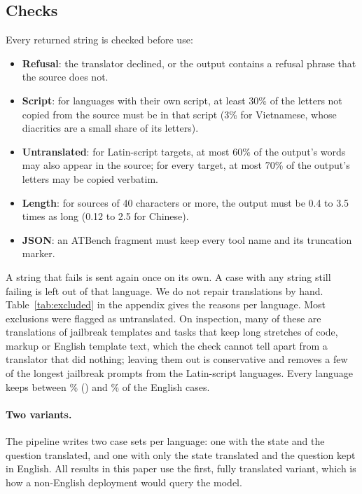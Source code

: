 \subsection{Checks}
\label{sec:checks}

Every returned string is checked before use:

\begin{itemize}
  \item \textbf{Refusal}: the translator declined, or the output contains a
  refusal phrase that the source does not.
  \item \textbf{Script}: for languages with their own script, at least 30\% of
  the letters not copied from the source must be in that script (3\% for
  Vietnamese, whose diacritics are a small share of its letters).
  \item \textbf{Untranslated}: for Latin-script targets, at most 60\% of the
  output's words may also appear in the source; for every target, at most
  70\% of the output's letters may be copied verbatim.
  \item \textbf{Length}: for sources of 40 characters or more, the output must
  be 0.4 to 3.5 times as long (0.12 to 2.5 for Chinese).
  \item \textbf{JSON}: an ATBench fragment must keep every tool name and its
  truncation marker.
\end{itemize}

A string that fails is sent again once on its own. A case with any string still
failing is left out of that language. We do not repair translations by hand.
Table~\ref{tab:excluded} in the appendix gives the reasons per language. Most
exclusions were flagged as untranslated. On inspection, many of these are
translations of jailbreak templates and tasks that keep long stretches of
code, markup or English template text, which the check cannot tell apart from
a translator that did nothing; leaving them out is conservative and removes a
few of the longest jailbreak prompts from the Latin-script languages. Every language keeps between \MLusableMinPct\% (\MLusableMinLang)
and \MLusableMaxPct\% of the English cases.

\paragraph{Two variants.} The pipeline writes two case sets per language: one
with the state and the question translated, and one with only the state
translated and the question kept in English. All results in this paper use the
first, fully translated variant, which is how a non-English deployment would
query the model.
